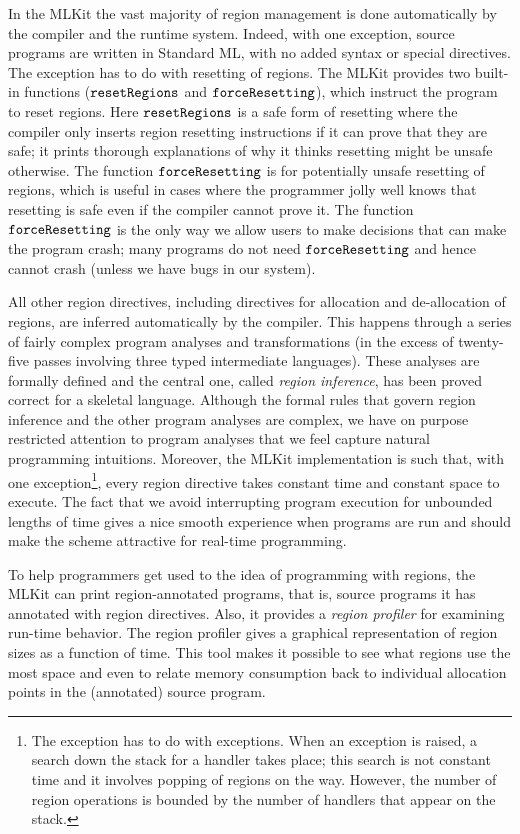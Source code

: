 \documentclass[12pt]{book}
\begin{document}
In the MLKit the vast majority of region management is done
automatically by the compiler and the runtime system.  Indeed, with
one exception, source programs are written in Standard ML, with no
added syntax or special directives. The exception has to do with
resetting of regions. The MLKit provides two built-in functions
%
%
($\hbox{\tt resetRegions}$ and $\hbox{\tt forceResetting}$), which instruct the program to reset
regions. Here $\hbox{\tt resetRegions}$ is a safe form of resetting where the compiler
only inserts region resetting instructions if it can prove that they
are safe; it prints thorough explanations of why it thinks resetting
might be unsafe otherwise. The function $\hbox{\tt forceResetting}$ is for potentially
unsafe resetting of regions, which is useful in cases where the
programmer jolly well knows that resetting is safe even if the
compiler cannot prove it. The function $\hbox{\tt forceResetting}$ is the only way we
allow users to make decisions that can make the program crash; many
programs do not need $\hbox{\tt forceResetting}$ and hence cannot crash (unless we have
bugs in our system).

All other region directives, including directives for allocation and
de-allocation of regions, are inferred automatically by the compiler.
This happens through a series of fairly complex program analyses and
transformations (in the excess of twenty-five passes involving three
typed intermediate languages). These analyses are formally defined and
the central one, called
%
{\em region inference}, has been proved correct for a skeletal
language. Although the formal rules that govern region inference and
the other program analyses are complex, we have on purpose restricted
attention to program analyses that we feel capture natural programming
intuitions.  Moreover, the MLKit implementation is such that, with one
exception\footnote{The exception has to do with exceptions. When an
  exception is raised, a search down the stack for a handler takes
  place; this search is not constant time and it involves popping of
  regions on the way. However, the number of region operations is
  bounded by the number of handlers that appear on the stack.}, every
region directive takes constant time and constant space to execute.
The fact that we avoid interrupting program execution for unbounded
lengths of time gives a nice smooth experience when programs are run
and should make the scheme attractive for real-time programming.

To help programmers get used to the idea of programming with regions,
the MLKit can print region-annotated programs, that is, source programs
it has annotated with region directives. Also, it provides a 
%
{\em region profiler\/} for examining run-time behavior.  The region
profiler gives a graphical representation of region sizes as a
function of time. This tool makes it possible to see what regions use
the most space and even to relate memory consumption back to
individual allocation points in the (annotated) source program.
\end{document}
